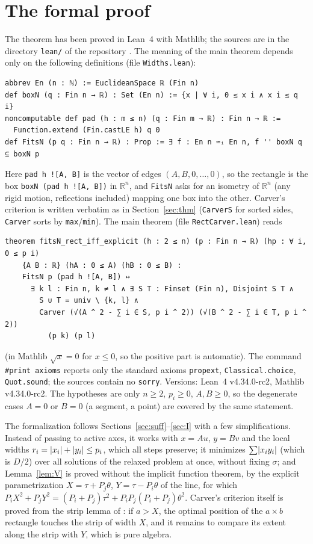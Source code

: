 \documentclass[11pt]{article}
\theoremstyle{definition}
\theoremstyle{remark}
\newcommand{\R}{\mathbb{R}}
\DeclarePairedDelimiter{\abs}{\lvert}{\rvert}
\begin{document}
\section{The formal proof}\label{sec:lean}

The theorem has been proved in Lean~4 with Mathlib; the sources are in the directory \texttt{lean/} of the
repository \cite{Repo}. The meaning of the main theorem depends only on the following definitions
(file \texttt{Widths.lean}):
\begin{verbatim}
abbrev En (n : ℕ) := EuclideanSpace ℝ (Fin n)
def boxN (q : Fin n → ℝ) : Set (En n) := {x | ∀ i, 0 ≤ x i ∧ x i ≤ q i}
noncomputable def pad (h : m ≤ n) (q : Fin m → ℝ) : Fin n → ℝ :=
  Function.extend (Fin.castLE h) q 0
def FitsN (p q : Fin n → ℝ) : Prop := ∃ f : En n ≃ᵢ En n, f '' boxN q ⊆ boxN p
\end{verbatim}
Here \texttt{pad h ![A, B]} is the vector of edges $(A,B,0,\dots,0)$, so the rectangle is the box
\texttt{boxN (pad h ![A, B])} in $\R^n$, and \texttt{FitsN} asks for an isometry of $\R^n$ (any rigid motion,
reflections included) mapping one box into the other. Carver's criterion is written verbatim as in
Section~\ref{sec:thm} (\texttt{CarverS} for sorted sides, \texttt{Carver} sorts by \texttt{max}/\texttt{min}).
The main theorem (file \texttt{RectCarver.lean}) reads
\begin{verbatim}
theorem fitsN_rect_iff_explicit (h : 2 ≤ n) (p : Fin n → ℝ) (hp : ∀ i, 0 ≤ p i)
    {A B : ℝ} (hA : 0 ≤ A) (hB : 0 ≤ B) :
    FitsN p (pad h ![A, B]) ↔
      ∃ k l : Fin n, k ≠ l ∧ ∃ S T : Finset (Fin n), Disjoint S T ∧
        S ∪ T = univ \ {k, l} ∧
        Carver (√(A ^ 2 - ∑ i ∈ S, p i ^ 2)) (√(B ^ 2 - ∑ i ∈ T, p i ^ 2))
          (p k) (p l)
\end{verbatim}
(in Mathlib $\sqrt x=0$ for $x\le0$, so the positive part is automatic). The command \texttt{\#print axioms}
reports only the standard axioms \texttt{propext}, \texttt{Classical.choice}, \texttt{Quot.sound}; the
sources contain no \texttt{sorry}. Versions: Lean~4 v4.34.0-rc2, Mathlib v4.34.0-rc2. The hypotheses are only
$n\ge2$, $p_i\ge0$, $A,B\ge0$, so the degenerate cases $A=0$ or $B=0$ (a segment, a point) are covered by the
same statement.

The formalization follows Sections~\ref{sec:suff}--\ref{sec:I} with a few simplifications.
Instead of passing to active axes, it works with $x=Au$, $y=Bv$ and the local widths
$r_i=\abs{x_i}+\abs{y_i}\le p_i$, which all steps preserve; it minimizes $\sum\abs{x_iy_i}$ (which is $D/2$) over
all solutions of the relaxed problem at once, without fixing $\sigma$; and Lemma~\ref{lem:V} is proved without the
implicit function theorem, by the explicit parametrization $X=\tau+P_j\theta$, $Y=\tau-P_i\theta$ of the line, for
which $P_iX^2+P_jY^2=(P_i+P_j)\tau^2+P_iP_j(P_i+P_j)\theta^2$. Carver's criterion itself is proved from the strip
lemma of \cite{Levit2026}: if $a>X$, the optimal position of the $a\times b$ rectangle touches the strip of width $X$,
and it remains to compare its extent along the strip with $Y$, which is pure algebra.
\end{document}
